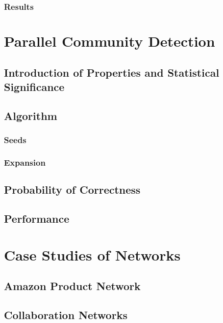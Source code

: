 \documentclass[phd,tocprelim]{cornell}
\begin{document}
\subsection{Results}

\chapter{Parallel Community Detection}

\section {Introduction of Properties and Statistical Significance}

\section{Algorithm}

\subsection{Seeds}

\subsection{Expansion}

\section{Probability of Correctness}

\section {Performance}

\chapter{Case Studies of Networks}

\section{Amazon Product Network}



\section{Collaboration Networks}
\end{document}
